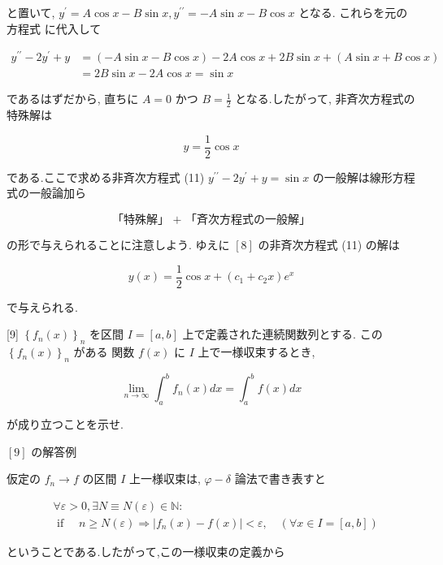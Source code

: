 \documentclass[10pt]{article}
\begin{document}
と置いて, $y^{\prime}=A \cos x-B \sin x, y^{\prime \prime}=-A \sin x-B \cos x$ となる. これらを元の方程式 に代入して

$$
\begin{aligned}
y^{\prime \prime}-2 y^{\prime}+y & =(-A \sin x-B \cos x)-2 A \cos x+2 B \sin x+(A \sin x+B \cos x) \\
& =2 B \sin x-2 A \cos x=\sin x
\end{aligned}
$$

であるはずだから, 直ちに $A=0$ かつ $B=\frac{1}{2}$ となる.したがって, 非斉次方程式の特殊解は


\begin{equation*}
y=\frac{1}{2} \cos x \tag{*2}
\end{equation*}


である.ここで求める非斉次方程式 (11) $y^{\prime \prime}-2 y^{\prime}+y=\sin x$ の一般解は線形方程式の一般論加ら

$$
\text { 「特殊解」 }+ \text { 「斉次方程式の一般解」 }
$$

の形で与えられることに注意しよう. ゆえに $[8]$ の非斉次方程式 (11) の解は


\begin{equation*}
y(x)=\frac{1}{2} \cos x+\left(c_{1}+c_{2} x\right) e^{x} \tag{*3}
\end{equation*}


で与えられる.

[9] $\left\{f_{n}(x)\right\}_{n}$ を区間 $I=[a, b]$ 上で定義された連続関数列とする. この $\left\{f_{n}(x)\right\}_{n}$ がある 関数 $f(x)$ に $I$ 上で一様収束するとき,


\begin{equation*}
\lim _{n \rightarrow \infty} \int_{a}^{b} f_{n}(x) d x=\int_{a}^{b} f(x) d x \tag{12}
\end{equation*}


が成り立つことを示せ.

$[9]$ の解答例

仮定の $f_{n} \rightarrow f$ の区間 $I$ 上一様収束は, $\varphi-\delta$ 論法で書き表すと

$$
\begin{aligned}
& \forall \varepsilon>0, \exists N \equiv N(\varepsilon) \in \mathbb{N}: \\
& \text { if } \quad n \geq N(\varepsilon) \Rightarrow\left|f_{n}(x)-f(x)\right|<\varepsilon, \quad(\forall x \in I=[a, b])
\end{aligned}
$$

ということである.したがって,この一様収束の定義から
\end{document}
